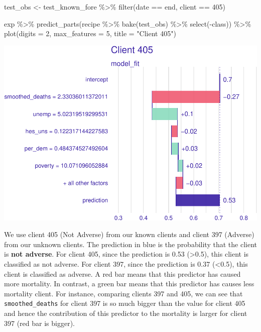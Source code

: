 \documentclass[
]{article}
\newenvironment{Shaded}{\begin{snugshade}}{\end{snugshade}}
\newcommand{\AttributeTok}[1]{\textcolor[rgb]{0.77,0.63,0.00}{#1}}
\newcommand{\DecValTok}[1]{\textcolor[rgb]{0.00,0.00,0.81}{#1}}
\newcommand{\FunctionTok}[1]{\textcolor[rgb]{0.00,0.00,0.00}{#1}}
\newcommand{\NormalTok}[1]{#1}
\newcommand{\OtherTok}[1]{\textcolor[rgb]{0.56,0.35,0.01}{#1}}
\newcommand{\SpecialCharTok}[1]{\textcolor[rgb]{0.00,0.00,0.00}{#1}}
\newcommand{\StringTok}[1]{\textcolor[rgb]{0.31,0.60,0.02}{#1}}
\begin{document}
\begin{Shaded}
\begin{Highlighting}[]
\NormalTok{test\_obs }\OtherTok{\textless{}{-}}
\NormalTok{  test\_known\_fore }\SpecialCharTok{\%\textgreater{}\%}
  \FunctionTok{filter}\NormalTok{(date }\SpecialCharTok{==}\NormalTok{ end, client }\SpecialCharTok{==} \DecValTok{405}\NormalTok{)}

\NormalTok{exp }\SpecialCharTok{\%\textgreater{}\%}
\FunctionTok{predict\_parts}\NormalTok{(recipe }\SpecialCharTok{\%\textgreater{}\%} \FunctionTok{bake}\NormalTok{(test\_obs) }\SpecialCharTok{\%\textgreater{}\%} \FunctionTok{select}\NormalTok{(}\SpecialCharTok{{-}}\NormalTok{class)) }\SpecialCharTok{\%\textgreater{}\%}
  \FunctionTok{plot}\NormalTok{(}\AttributeTok{digits =} \DecValTok{2}\NormalTok{, }\AttributeTok{max\_features =} \DecValTok{5}\NormalTok{, }\AttributeTok{title =} \StringTok{"Client 405"}\NormalTok{)}
\end{Highlighting}
\end{Shaded}

\includegraphics{figures/report/fig-unnamed-chunk-60-2.pdf}

We use client 405 (Not Adverse) from our known clients and client 397
(Adverse) from our unknown clients. The prediction in blue is the
probability that the client is \textbf{not adverse}. For client 405,
since the prediction is 0.53 (\textgreater0.5), this client is
classified as not adverse. For client 397, since the prediction is 0.37
(\textless0.5), this client is classified as adverse. A red bar means
that this predictor has caused more mortality. In contrast, a green bar
means that this predictor has causes less mortality client. For
instance, comparing clients 397 and 405, we can see that
\texttt{smoothed\_deaths} for client 397 is so much bigger than the
value for client 405 and hence the contribution of this predictor to the
mortality is larger for client 397 (red bar is bigger).
\end{document}
